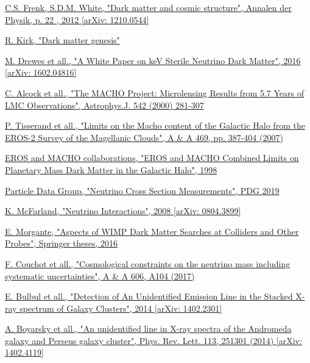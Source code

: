 \documentclass[a4paper, 10pt, openright]{report}
\begin{document}
\begin{thebibliography}{1}
\href{https://arxiv.org/pdf/1210.0544.pdf}{C.S. Frenk, S.D.M. White,
"Dark matter and cosmic structure",
Annalen der Physik, p. 22 , 2012 [arXiv: 1210.0544]
}

\href{http://inspirehep.net/record/1683379/files/fulltext.pdf}{R. Kirk,
"Dark matter genesis"}

\href{https://arxiv.org/pdf/1602.04816.pdf}{M. Drewes et all.,
"A White Paper on keV Sterile Neutrino Dark Matter",
2016 [arXiv: 1602.04816]
}

\href{https://arxiv.org/pdf/astro-ph/0001272}{C. Alcock et all.,
"The MACHO Project: Microlensing Results from 5.7 Years of LMC Observations",
	Astrophys.J. 542 (2000) 281-307
}

\href{https://www.aanda.org/articles/aa/pdf/2007/26/aa6017-06.pdf}{P. Tisserand et all.,
"Limits on the Macho content of the Galactic Halo from the EROS-2 Survey of the Magellanic Clouds",
A \& A 469, pp. 387-404 (2007)
}

\href{https://arxiv.org/abs/astro-ph/9803082}{EROS and MACHO collaborations,
"EROS and MACHO Combined Limits on Planetary Mass Dark Matter in the Galactic Halo",
1998
}

\href{http://pdg.lbl.gov/2019/reviews/rpp2018-rev-nu-cross-sections.pdf}{Particle Data Group,
"Neutrino Cross Section Measurements",
PDG 2019
}

\href{https://arxiv.org/pdf/0804.3899.pdf}{K. McFarland,
"Neutrino Interactions",
2008 [arXiv: 0804.3899]
}

\href{http://inspirehep.net/record/1510610}{E. Morgante,
"Aspects of WIMP Dark Matter Searches at Colliders and Other Probes",
Springer theses, 2016
}

\href{https://www.aanda.org/articles/aa/pdf/2017/10/aa30927-17.pdf}{F. Couchot et all.,
"Cosmological constraints on the neutrino mass including systematic uncertainties",
A \& A 606, A104 (2017)
}

\href{https://arxiv.org/abs/1402.2301}{E. Bulbul et all.,
"Detection of An Unidentified Emission Line in the Stacked X-ray spectrum of Galaxy Clusters",
2014 [arXiv: 1402.2301]
}

\href{https://arxiv.org/abs/1402.4119}{A. Boyarsky et all.,
"An unidentified line in X-ray spectra of the Andromeda galaxy and Perseus galaxy cluster",
Phys. Rev. Lett. 113, 251301 (2014) [arXiv: 1402.4119]
}


\end{thebibliography}
\end{document}
